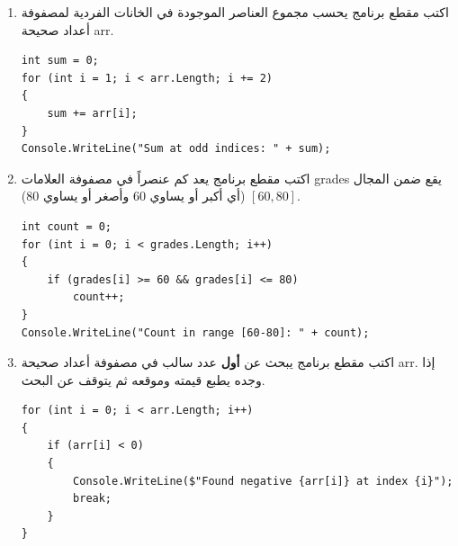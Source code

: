 \documentclass[14pt]{extarticle}
\begin{document}
\begin{enumerate}[itemsep=2em]
    \item
    اكتب مقطع برنامج يحسب مجموع العناصر الموجودة في الخانات الفردية لمصفوفة أعداد صحيحة \textenglish{arr}.
    \ifwithsols
    \begin{boxSolution}
    \begin{english}
    \begin{verbatim}
int sum = 0;
for (int i = 1; i < arr.Length; i += 2)
{
    sum += arr[i];
}
Console.WriteLine("Sum at odd indices: " + sum);
    \end{verbatim}
    \end{english}
    \end{boxSolution}
    \fi

    \item
    اكتب مقطع برنامج يعد كم عنصراً في مصفوفة العلامات \textenglish{grades} يقع ضمن المجال $[60, 80]$ (أي أكبر أو يساوي 60 وأصغر أو يساوي 80).
    \ifwithsols
    \begin{boxSolution}
    \begin{english}
    \begin{verbatim}
int count = 0;
for (int i = 0; i < grades.Length; i++)
{
    if (grades[i] >= 60 && grades[i] <= 80)
        count++;
}
Console.WriteLine("Count in range [60-80]: " + count);
    \end{verbatim}
    \end{english}
    \end{boxSolution}
    \fi

    \item
    اكتب مقطع برنامج يبحث عن \textbf{أول} عدد سالب في مصفوفة أعداد صحيحة \textenglish{arr}.
    إذا وجده يطبع قيمته وموقعه ثم يتوقف عن البحث.
    \ifwithsols
    \begin{boxSolution}
    \begin{english}
    \begin{verbatim}
for (int i = 0; i < arr.Length; i++)
{
    if (arr[i] < 0)
    {
        Console.WriteLine($"Found negative {arr[i]} at index {i}");
        break;
    }
}
    \end{verbatim}
    \end{english}
    \end{boxSolution}
    \fi


\end{enumerate}
\end{document}

